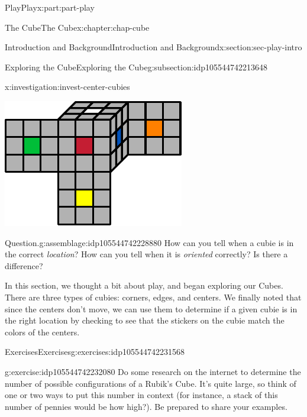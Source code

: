 \documentclass[oneside,10pt,]{book}
\numberwithin{equation}{section}
\begin{document}
\begin{partptx}{Play}{}{Play}{}{}{x:part:part-play}
\begin{chapterptx}{The Cube}{}{The Cube}{}{}{x:chapter:chap-cube}
\begin{sectionptx}{Introduction and Background}{}{Introduction and Background}{}{}{x:section:sec-play-intro}
\begin{subsectionptx}{Exploring the Cube}{}{Exploring the Cube}{}{}{g:subsection:idp105544742213648}
\begin{investigation}{}{x:investigation:invest-center-cubies}
\begin{image}{0.25}{0.5}{0.25}
\includegraphics[width=\linewidth]{./images/moving_cubies.pdf}
\end{image}%
\end{investigation}%
\begin{assemblage}{Question.}{g:assemblage:idp105544742228880}%
How can you tell when a cubie is in the correct \emph{location}? How can you tell when it is \emph{oriented} correctly? Is there a difference?\footnotemark{}%
\end{assemblage}
%
\begin{conclusion}{}%
In this section, we thought a bit about play, and began exploring our Cubes. There are three types of cubies: corners, edges, and centers. We finally noted that since the centers don't move, we can use them to determine if a given cubie is in the right location by checking to see that the stickers on the cubie match the colors of the centers.%
\end{conclusion}%
\end{subsectionptx}
%
%
\typeout{************************************************}
\typeout{************************************************}
%
\begin{exercises-subsection}{Exercises}{}{Exercises}{}{}{g:exercises:idp105544742231568}
\begin{divisionexercise}{1}{}{}{g:exercise:idp105544742232080}%
Do some research on the internet to determine the number of possible configurations of a Rubik's Cube. It's quite large, so think of one or two ways to put this number in context (for instance, a stack of this number of pennies would be how high?). Be prepared to share your examples.%

\end{divisionexercise}
\end{exercises-subsection}
\end{sectionptx}
\end{chapterptx}
\end{partptx}
\end{document}
